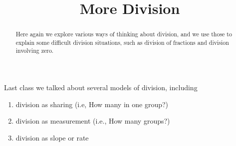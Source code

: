\documentclass{ximera}
\title{More Division}
\begin{document}
\begin{abstract}
Here again we explore various ways of thinking about division, and we use those to explain some difficult division situations, such as division of fractions and division involving zero.
\end{abstract}
\maketitle


%
%
%


Last class we talked about several models of division, including 
\begin{enumerate}
\item division as sharing (i.e, How many in one group?)
\item division as measurement (i.e., How many groups?)
\item division as slope or rate
\end{enumerate}
\end{document}
